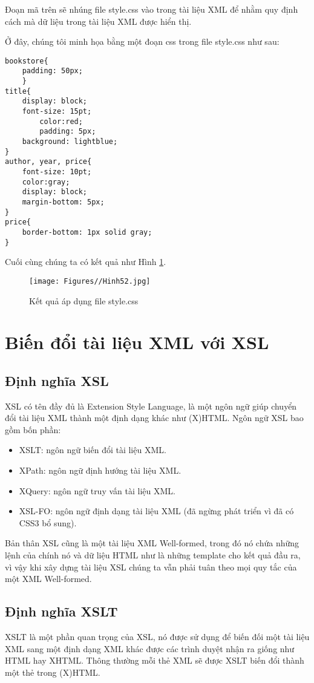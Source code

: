 Đoạn mã trên sẽ nhúng file style.css vào trong tài liệu XML để nhằm quy định cách mà dữ liệu trong tài liệu XML được hiển thị.

Ở đây, chúng tôi minh họa bằng một đoạn css trong file style.css như sau:
\lstset{language=XML}
\begin{lstlisting}[escapechar=`]
bookstore{
	padding: 50px;
	}
title{
	display: block;
	font-size: 15pt;
	 	color:red;
	 	padding: 5px;
	background: lightblue;
}
author, year, price{
	font-size: 10pt;
	color:gray;
	display: block;
	margin-bottom: 5px;
}
price{
	border-bottom: 1px solid gray;
}
\end{lstlisting}
Cuối cùng chúng ta có kết quả như Hình \ref{hinh54}.
\begin{figure}[!ht]
\centering
\texttt{[image: Figures//Hinh52.jpg]}
\caption{ Kết quả áp dụng file style.css }\label{hinh54} 
\end{figure}

\section{ Biến đổi tài liệu XML với XSL}
\subsection {Định nghĩa XSL}
XSL có tên đầy đủ là Extension Style Language, là một ngôn ngữ giúp chuyển đổi tài liệu XML thành một định dạng khác như (X)HTML. Ngôn ngữ XSL bao gồm bốn phần:
\begin{itemize}


\item	XSLT: ngôn ngữ biến đổi tài liệu XML.
\item	XPath: ngôn ngữ định hướng tài liệu XML.
\item	XQuery: ngôn ngữ truy vấn tài liệu XML.
\item	XSL-FO: ngôn ngữ định dạng tài liệu XML (đã ngừng phát triển vì đã có CSS3 bổ sung).
\end{itemize}

Bản thân XSL cũng là một tài liệu XML Well-formed, trong đó nó chứa những lệnh của chính nó và dữ liệu HTML như là những template cho kết quả đầu ra, vì vậy khi xây dựng tài liệu XSL chúng ta vẫn phải tuân theo mọi quy tắc của một XML Well-formed.
\subsection{Định nghĩa XSLT}
XSLT là một phần quan trọng của XSL, nó được sử dụng để biến đối một tài liệu XML sang một định dạng XML khác được các trình duyệt nhận ra giống như HTML hay XHTML. Thông thường mỗi thẻ XML sẽ được XSLT biến đổi thành một thẻ trong (X)HTML.

